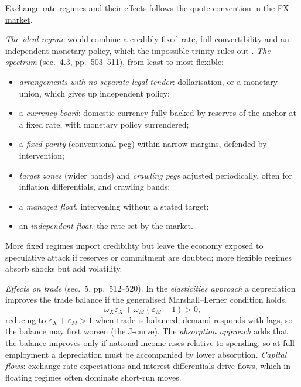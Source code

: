 \hyperref[def:exchange-rate-regimes-capital-flows]{Exchange-rate regimes and their effects} follows the quote convention in \hyperref[def:fx-market-real-exchange-rates]{the FX market}.

\begin{qfdefinition}\label{def:exchange-rate-regimes-capital-flows}
 \emph{The ideal regime} would combine a credibly fixed rate, full convertibility and an independent monetary policy, which the impossible trinity rules out \citep[chap.~9, sec.~4.1, p.~500]{economics-investment-decision-makers-2013}. \emph{The spectrum} (sec.~4.3, pp.~503--511), from least to most flexible:
\begin{itemize}
\item \emph{arrangements with no separate legal tender}: dollarisation, or a monetary union, which gives up independent policy;
\item a \emph{currency board}: domestic currency fully backed by reserves of the anchor at a fixed rate, with monetary policy surrendered;
\item a \emph{fixed parity} (conventional peg) within narrow margins, defended by intervention;
\item \emph{target zones} (wider bands) and \emph{crawling pegs} adjusted periodically, often for inflation differentials, and crawling bands;
\item a \emph{managed float}, intervening without a stated target;
\item an \emph{independent float}, the rate set by the market.
\end{itemize}
More fixed regimes import credibility but leave the economy exposed to speculative attack if reserves or commitment are doubted; more flexible regimes absorb shocks but add volatility.

\emph{Effects on trade} (sec.~5, pp.~512--520). In the \emph{elasticities approach} a depreciation improves the trade balance if the generalised Marshall--Lerner condition holds,
\[
\omega_X\varepsilon_X+\omega_M(\varepsilon_M-1)>0,
\]
reducing to $\varepsilon_X+\varepsilon_M>1$ when trade is balanced; demand responds with lags, so the balance may first worsen (the J-curve). The \emph{absorption approach} adds that the balance improves only if national income rises relative to spending, so at full employment a depreciation must be accompanied by lower absorption. \emph{Capital flows}: exchange-rate expectations and interest differentials drive flows, which in floating regimes often dominate short-run moves.


\end{qfdefinition}
